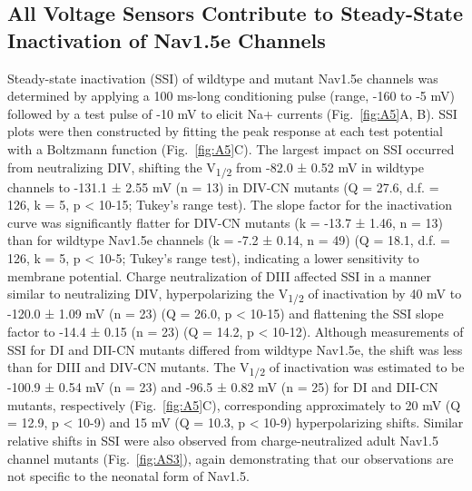 \subsection{All Voltage Sensors Contribute to Steady-State Inactivation of Nav1.5e Channels}
Steady-state inactivation (SSI) of wildtype and mutant Nav1.5e channels was determined by applying a 100 ms-long conditioning pulse (range, -160 to -5 mV) followed by a test pulse of -10 mV to elicit Na+ currents (Fig.~\ref{fig:A5}A, B). SSI plots were then constructed by fitting the peak response at each test potential with a Boltzmann function (Fig.~\ref{fig:A5}C). The largest impact on SSI occurred from neutralizing DIV, shifting the V\textsubscript{1/2} from -82.0 ± 0.52 mV in wildtype channels to -131.1 ± 2.55 mV (n = 13) in DIV-CN mutants (Q = 27.6, d.f. = 126, k = 5, p < 10-15; Tukey’s range test). The slope factor for the inactivation curve was significantly flatter for DIV-CN mutants (k = -13.7 ± 1.46, n = 13) than for wildtype Nav1.5e channels (k = -7.2 ± 0.14, n = 49) (Q = 18.1, d.f. = 126, k = 5, p < 10-5; Tukey’s range test), indicating a lower sensitivity to membrane potential. Charge neutralization of DIII affected SSI in a manner similar to neutralizing DIV, hyperpolarizing the V\textsubscript{1/2} of inactivation by 40 mV to -120.0 ± 1.09 mV (n = 23) (Q = 26.0, p < 10-15) and flattening the SSI slope factor to -14.4 ± 0.15 (n = 23) (Q = 14.2, p < 10-12). Although measurements of SSI for DI and DII-CN mutants differed from wildtype Nav1.5e, the shift was less than for DIII and DIV-CN mutants. The V\textsubscript{1/2} of inactivation was estimated to be -100.9 ± 0.54 mV (n = 23) and -96.5 ± 0.82 mV (n = 25) for DI and DII-CN mutants, respectively (Fig.~\ref{fig:A5}C), corresponding approximately to 20 mV (Q = 12.9, p < 10-9) and 15 mV (Q = 10.3, p < 10-9) hyperpolarizing shifts. Similar relative shifts in SSI were also observed from charge-neutralized adult Nav1.5 channel mutants (Fig.~\ref{fig:AS3}), again demonstrating that our observations are not specific to the neonatal form of Nav1.5.

